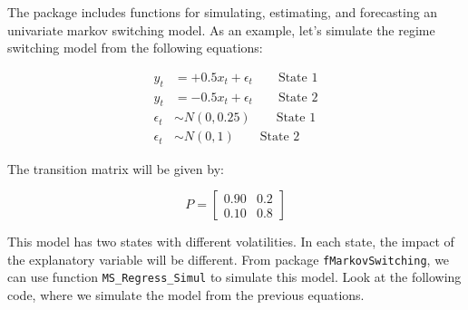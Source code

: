 \documentclass[11pt,]{book}
\begin{document}
The package includes functions for simulating, estimating, and
forecasting an univariate markov switching model. As an example, let's
simulate the regime switching model from the following equations:

\begin{align*}
y_{t}&= +0.5x_t+\epsilon_{t} \qquad \mbox{State 1} \\
y_{t}&=-0.5x_t+\epsilon_{t} \qquad \mbox{State 2} \\
\epsilon _t &\sim N(0,0.25) \qquad \mbox{State 1} \\
\epsilon _t &\sim N(0,1) \qquad \mbox{State 2}
\end{align*}

The transition matrix will be given by:

\[
P=\left[ \begin{array}{ccc}
0.90 & 0.2 \\
0.10 & 0.8
\end{array} \right ]
\]

This model has two states with different volatilities. In each state,
the impact of the explanatory variable will be different. From package
\texttt{fMarkovSwitching}, we can use function
\texttt{MS\_Regress\_Simul} to simulate this model. Look at the
following code, where we simulate the model from the previous equations.
\end{document}
